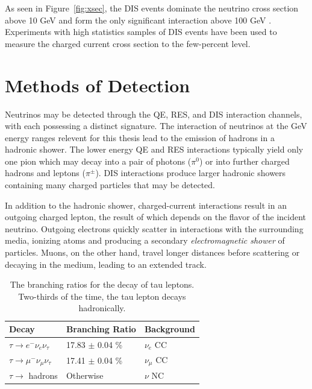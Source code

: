 As seen in Figure~\ref{fig:xsec}, the DIS events dominate the neutrino cross section above 10 GeV and form the only significant interaction above 100 GeV \cite{Formaggio-Xsec}. 
Experiments with high statistics samples of DIS events have been used to measure the charged current cross section to the few-percent level.


\label{sec:detection_methods}
\section{Methods of Detection}
Neutrinos may be detected through the QE, RES, and DIS interaction channels, with each possessing a distinct signature.
The interaction of neutrinos at the GeV energy ranges relevent for this thesis lead to the emission of hadrons in a hadronic shower.
The lower energy QE and RES interactions typically yield only one pion which may decay into a pair of photons ($\pi^0$) or into further charged hadrons and leptons ($\pi^\pm$).
DIS interactions produce larger hadronic showers containing many charged particles that may be detected.

In addition to the hadronic shower, charged-current interactions result in an outgoing charged lepton, the result of which depends on the flavor of the incident neutrino.
Outgoing electrons quickly scatter in interactions with the surrounding media, ionizing atoms and producing a secondary \emph{electromagnetic shower} of particles.
Muons, on the other hand, travel longer distances before scattering or decaying in the medium, leading to an extended track.

\begin{table}[]
\centering
\begin{tabular}{@{}lll@{}}
\toprule
Decay                                     & Branching Ratio     & Background   \\ \midrule
$\tau \rightarrow e^- \nu_e \nu_\tau$     & 17.83 $\pm$ 0.04 \% & $\nu_e$ CC   \\
$\tau \rightarrow \mu^- \nu_\mu \nu_\tau$ & 17.41 $\pm$ 0.04 \% & $\nu_\mu$ CC \\
$\tau \rightarrow$ hadrons                & Otherwise           & $\nu$ NC     \\ \bottomrule
\end{tabular}
\caption{The branching ratios for the decay of tau leptons. Two-thirds of the time, the tau lepton decays hadronically.}
\label{tab:tau_decays}
\end{table}

